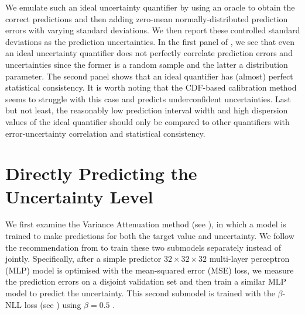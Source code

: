 \noindent We emulate such an ideal uncertainty quantifier by using an oracle to obtain the correct predictions and then adding zero-mean normally-distributed prediction errors with varying standard deviations. We then report these controlled standard deviations as the prediction uncertainties. In the first panel of , we see that even an ideal uncertainty quantifier does not perfectly correlate prediction errors and uncertainties since the former is a random sample and the latter a distribution parameter. The second panel shows that an ideal quantifier has (almost) perfect statistical consistency. It is worth noting that the CDF-based calibration method seems to struggle with this case and predicts underconfident uncertainties. Last but not least, the reasonably low prediction interval width and high dispersion values of the ideal quantifier should only be compared to other quantifiers with error-uncertainty correlation and statistical consistency.

\section{Directly Predicting the Uncertainty Level} \label{txt:uncertainty-predict-sigma}

We first examine the Variance Attenuation method (see ), in which a model is trained to make predictions for both the target value and uncertainty. We follow the recommendation from \textcite{reliable-variance-2019} to train these two submodels separately instead of jointly. Specifically, after a simple predictor $32 \times 32 \times 32$ multi-layer perceptron (MLP) model is optimised with the mean-squared error (MSE) loss, we measure the prediction errors on a disjoint validation set and then train a similar MLP model to predict the uncertainty. This second submodel is trained with the $\beta$-NLL loss (see ) using $\beta = 0.5$ \cite{beta-nll-2022}.

